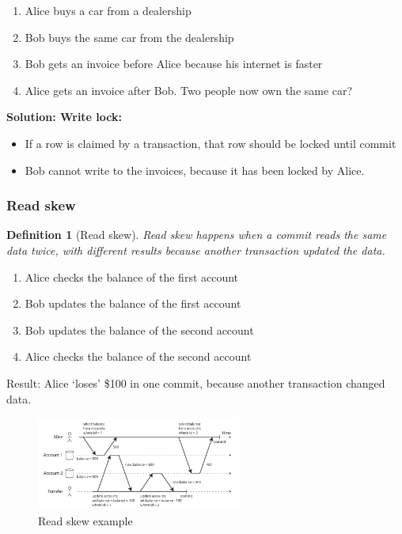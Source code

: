 \documentclass{article}
\newtheorem{theorem}{Definition}[section]
\begin{document}
\begin{enumerate}
    \item Alice buys a car from a dealership
    \item Bob buys the same car from the dealership
    \item Bob gets an invoice before Alice because his internet is faster
    \item Alice gets an invoice after Bob. Two people now own the same car?
\end{enumerate}

\textbf{Solution: Write lock:}

\begin{itemize}
    \item If a row is claimed by a transaction, that row should be locked until commit
    \item Bob cannot write to the invoices, because it has been locked by Alice.
\end{itemize}

\subsubsection{Read skew}

\begin{theorem}[Read skew]
Read skew happens when a commit reads the same data twice, 
with different results because another transaction updated the data.
\end{theorem}

\begin{enumerate}
    \item Alice checks the balance of the first account
    \item Bob updates the balance of the first account
    \item Bob updates the balance of the second account
    \item Alice checks the balance of the second account
\end{enumerate}

Result: Alice `loses' \$100 in one commit, because another transaction changed data.

\begin{figure}[H]
    \centering
    \includegraphics[width=0.6\textwidth]{read-skew.png}
    \caption{Read skew example}
\end{figure}
\end{document}
